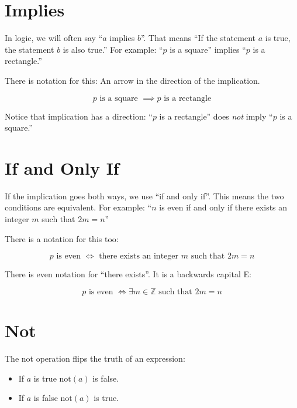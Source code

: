 \section{Implies}

In logic, we will often say ``$a$ implies $b$''.  That means ``If the
statement $a$ is true, the statement $b$ is also true.''  For example:
``$p$ is a square'' implies ``$p$ is a rectangle.''

There is notation for this: An arrow in the direction of the implication.

$$p \text{ is a square } \implies p \text{ is a rectangle}$$

Notice that implication has a direction: ``$p$ is a rectangle'' does \textit{not} imply 
``$p$ is a square.''

\section {If and Only If}

If the implication goes both ways, we use ``if and only if''.  This
means the two conditions are equivalent.  For example: ``$n$ is even
if and only if there exists an integer $m$ such that $2m = n$'' 

There is a notation for this too:

$$p \text{ is even } \iff \text{ there exists an integer } m \text{ such that } 2m = n$$

There is even notation for ``there exists''. It is a backwards capital E:

$$p \text{ is even } \iff \exists m \in \mathbb{Z}  \text{ such that } 2m = n$$

\section {Not}

The not operation flips the truth of an expression:
\begin{itemize}
\item If $a$ is true $\text{not}(a)$ is false.

\item If $a$ is false $\text{not}(a)$ is true.
\end{itemize}


